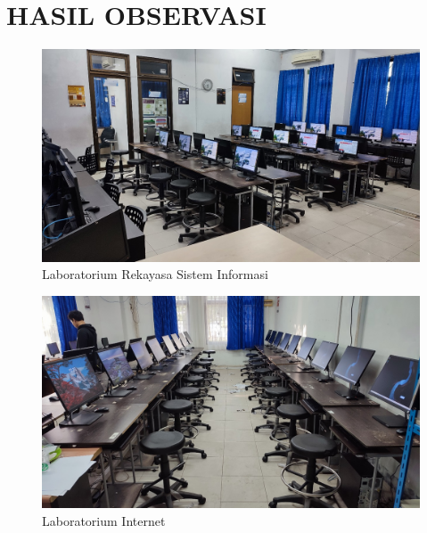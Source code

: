 %
%
%
%


\renewcommand{\thepage}{B - \arabic{page}}
\chapter{HASIL OBSERVASI}
\begin{figure}
	\centering
	\includegraphics[width=0.82\linewidth]{konten/gambar/lab-rsi.jpg}
	\caption{Laboratorium Rekayasa Sistem Informasi}
	\label{fig:lab-rsi}
\end{figure}

\begin{figure}
	\centering
	\includegraphics[width=0.82\linewidth]{konten/gambar/lab-internet.jpg}
	\caption{Laboratorium Internet}
	\label{fig:lab-int}
\end{figure}

